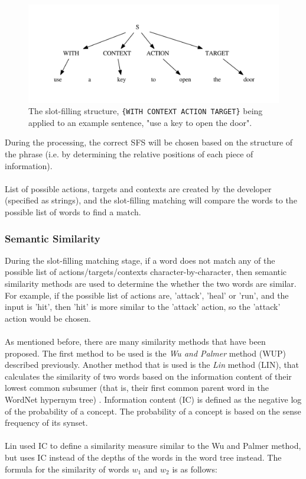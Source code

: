 \documentclass[11pt]{article}
\begin{document}
\begin{center}
\begin{figure}[H]
\begin{center}
  \includegraphics[width=\linewidth]{sfs-2.pdf}
  \caption{The slot-filling structure, \texttt{\{WITH CONTEXT ACTION TARGET\}} being applied to an example sentence, "use a key to open the door".}
  \label{fig:sfs-2}
  \end{center}
\end{figure}
\end{center}

During the processing, the correct SFS will be chosen based on the structure of the phrase (i.e. by determining the relative positions of each piece of information).
\\
\\
List of possible actions, targets and contexts are created by the developer (specified as strings), and the slot-filling matching will compare the words to the possible list of words to find a match.

\subsubsection{Semantic Similarity}
\label{semantic-sim-design}

During the slot-filling  matching stage, if a word does not match any of the possible list of actions/targets/contexts character-by-character, then semantic similarity methods are used to determine the whether the two words are similar. For example, if the possible list of actions are, 'attack', 'heal' or 'run', and the input is 'hit', then 'hit' is more similar to the 'attack' action, so the 'attack' action would be chosen.
\\
\\
As mentioned before, there are many similarity methods that have been proposed. The first method to be used is the \textit{Wu and Palmer} method (WUP) described previously. Another method that is used is the \textit{Lin} method (LIN), that calculates the similarity of two words based on the information content of their lowest common subsumer (that is, their first common parent word in the WordNet hypernym tree) \cite{RefWorks:46}. Information content (IC) is defined as the negative log of the probability of a concept. The probability of a concept is based on the sense frequency of its synset.
\\
\\
Lin used IC to define a similarity measure similar to the Wu and Palmer method, but uses IC instead of the depths of the words in the word tree instead. The formula for the similarity of words $w_1$ and $w_2$ is as follows:
\end{document}
